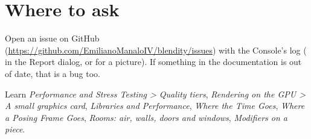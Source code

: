 \section{Where to ask}
Open an issue on GitHub (\url{https://github.com/EmilianoManaloIV/blendity/issues}) with the Console's log (
in the Report dialog, or  for a picture). If something in the documentation is out
of date, that is a bug too.

\begin{fromnote}{Learn}
\emph{Performance and Stress Testing > Quality tiers}, \emph{Rendering on the GPU > A small graphics card},
\emph{Libraries and Performance}, \emph{Where the Time Goes}, \emph{Where a Posing Frame Goes}, \emph{Rooms: air, walls, doors and windows}, \emph{Modifiers on a piece}.
\end{fromnote}
